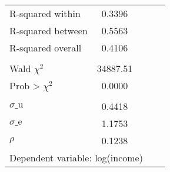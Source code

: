 {\begin{tabular}{l*{1}{cccc}}
\\ R-squared within &      0.3396&            &            &            \\
R-squared between   &      0.5563&            &            &            \\
R-squared overall   &      0.4106&            &            &            \\
\\ Wald $\chi^2$    &    34887.51&            &            &            \\
Prob > $\chi^2$     &      0.0000&            &            &            \\
\\ $\sigma\text{\_u}$&      0.4418&            &            &            \\
$\sigma\text{\_e}$   &      1.1753&            &            &            \\
$\rho$              &      0.1238&            &            &            \\
\bottomrule
\multicolumn{5}{l}{\footnotesize Dependent variable: log(income)}\\
\end{tabular}
}
